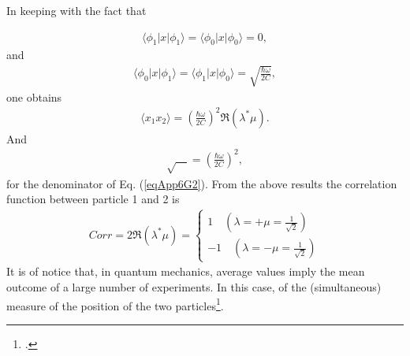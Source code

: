 \begin{subappendices}
In keeping with the fact that

\begin{align}\label{eqApp6G4}
\langle\phi_1|x|\phi_1\rangle=\langle\phi_0|x|\phi_0\rangle=0,
\end{align} 
and
\begin{align}\label{eqApp6G5}
\langle\phi_0|x|\phi_1\rangle=\langle\phi_1|x|\phi_0\rangle=\sqrt{\frac{\hbar\omega}{2C}},
\end{align}
one obtains
\begin{align}\label{eqApp6G6}
\langle x_1x_2\rangle=\left(\frac{\hbar\omega}{2C}\right)^2\Re(\lambda^*\mu).
\end{align} 
And 
\begin{align}\label{eqApp6G7}
\sqrt{\quad}=\left(\frac{\hbar\omega}{2C}\right)^2,
\end{align}
for the denominator of Eq. (\ref{eqApp6G2}).
From the above results the correlation function between particle 1 and 2 is
\begin{align}\label{eqApp6G8}
Corr=2\Re(\lambda^*\mu)=
\left\{
\begin{array}{c}
 1\quad (\lambda=+\mu=\frac{1}{\sqrt{2}})\\ 
 -1 \quad (\lambda=-\mu=\frac{1}{\sqrt{2}})
\end{array}
\right. 
\end{align}
It is of notice that, in quantum mechanics, average values imply the mean outcome of a large number of experiments. In this case, of the (simultaneous) measure of the position of the two particles\footnote{\cite{Basdevant:05}.}.







\end{subappendices}
